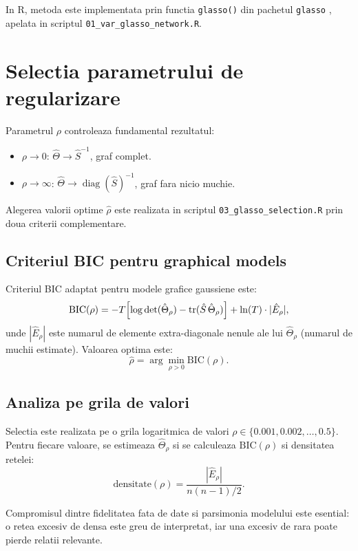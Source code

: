In R, metoda este implementata prin functia \texttt{glasso()} din pachetul
\texttt{glasso} \citep{friedman2019}, apelata in scriptul
\texttt{01\_var\_glasso\_network.R}.

\section{Selectia parametrului de regularizare}

Parametrul $\rho$ controleaza fundamental rezultatul:
\begin{itemize}
    \item $\rho \to 0$: $\hat{\Theta} \to \hat{S}^{-1}$, graf complet.
    \item $\rho \to \infty$: $\hat{\Theta} \to \operatorname{diag}(\hat{S})^{-1}$,
    graf fara nicio muchie.
\end{itemize}

Alegerea valorii optime $\hat{\rho}$ este realizata in scriptul
\texttt{03\_glasso\_selection.R} prin doua criterii complementare.

\subsection{Criteriul BIC pentru graphical models}

Criteriul BIC adaptat pentru modele grafice gaussiene \citep{yuan2007} este:
\begin{equation}
    \mathrm{BIC}(\rho) = -T\Bigl[\log\det(\hat{\Theta}_\rho)
    - \operatorname{tr}(\hat{S}\,\hat{\Theta}_\rho)\Bigr]
    + \ln(T) \cdot |\hat{E}_\rho|,
    \label{eq:bic_glasso}
\end{equation}
unde $|\hat{E}_\rho|$ este numarul de elemente extra-diagonale nenule ale lui
$\hat{\Theta}_\rho$ (numarul de muchii estimate). Valoarea optima este:
\[
    \hat{\rho} = \arg\min_{\rho > 0} \mathrm{BIC}(\rho).
\]

\subsection{Analiza pe grila de valori}

Selectia este realizata pe o grila logaritmica de valori
$\rho \in \{0.001, 0.002, \ldots, 0.5\}$. Pentru fiecare valoare, se estimeaza
$\hat{\Theta}_\rho$ si se calculeaza $\mathrm{BIC}(\rho)$ si densitatea retelei:
\[
    \mathrm{densitate}(\rho) = \frac{|\hat{E}_\rho|}{n(n-1)/2}.
\]

Compromisul dintre fidelitatea fata de date si parsimonia modelului este
esential: o retea excesiv de densa este greu de interpretat, iar una excesiv
de rara poate pierde relatii relevante.

